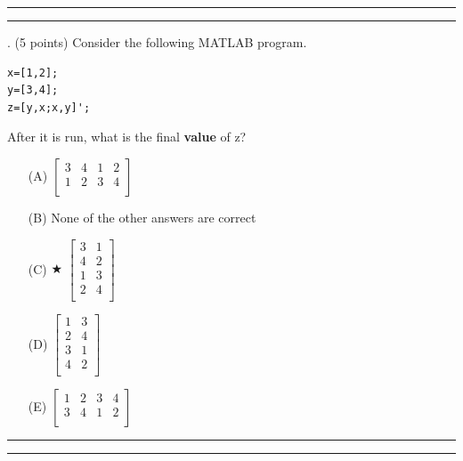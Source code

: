 \documentclass{article}
\begin{document}
\vspace*{2em}
\hrule
\vspace{2em}

\vspace{2em}
\hrule height 2pt


\newpage
{}. (5 points)
Consider the following MATLAB program.
\begin{verbatim}
x=[1,2];
y=[3,4];
z=[y,x;x,y]';
\end{verbatim}
After it is run, what is the final \textbf{value} of z?


\begin{enumerate}
\item[(A)]
$ \left[ \begin{array}{cccc} 3 & 4 & 1 & 2\\ 1 & 2 & 3 & 4 \\ \end{array} \right] $

\item[(B)]
None of the other answers are correct

\item[(C)] $\bigstar$ 
$ \left[ \begin{array}{cc} 3 & 1 \\ 4 & 2 \\ 1 & 3 \\ 2 & 4 \\ \end{array} \right] $

\item[(D)]
$ \left[ \begin{array}{cc} 1 & 3 \\ 2 & 4 \\ 3 & 1 \\ 4 & 2 \\ \end{array} \right] $

\item[(E)]
$ \left[ \begin{array}{cccc} 1 & 2 & 3 & 4\\ 3 & 4 & 1 & 2 \\ \end{array} \right] $

\end{enumerate}

\vspace*{2em}
\hrule
\vspace{2em}

\vspace{2em}
\hrule height 2pt
\end{document}
